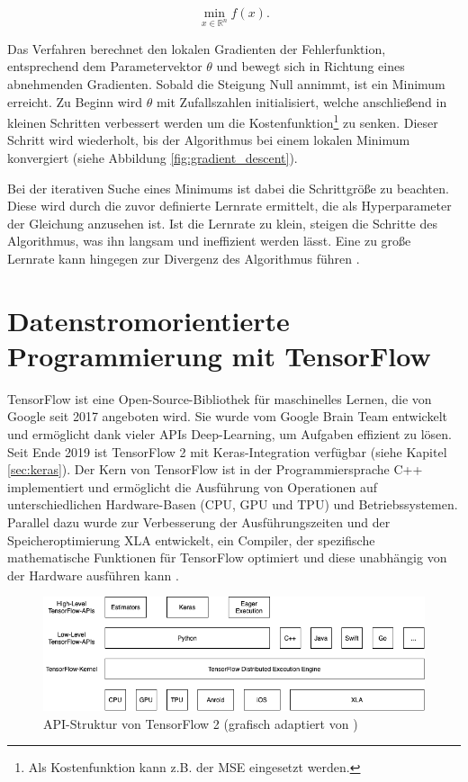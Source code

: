 \begin{equation}
	\min_{x\in\mathbb{R}^n} f(x).
\end{equation}

Das Verfahren berechnet den lokalen Gradienten der Fehlerfunktion, entsprechend dem Parametervektor $\theta$ und bewegt sich in Richtung eines abnehmenden Gradienten. Sobald die Steigung Null annimmt, ist ein Minimum erreicht. Zu Beginn wird $\theta$ mit Zufallszahlen initialisiert, welche anschließend in kleinen Schritten verbessert werden um die Kostenfunktion\footnote{Als Kostenfunktion kann z.B. der \ac{MSE} eingesetzt werden.} zu senken. Dieser Schritt wird wiederholt, bis der Algorithmus bei einem lokalen Minimum konvergiert \cite[112\psq]{Géron2017} (siehe Abbildung \ref{fig:gradient_descent}). 



Bei der iterativen Suche eines Minimums ist dabei die Schrittgröße zu beachten. Diese wird durch die zuvor definierte Lernrate ermittelt, die als \gls{Hyperparameter} der Gleichung anzusehen ist. Ist die Lernrate zu klein, steigen die Schritte des Algorithmus, was ihn langsam und ineffizient werden lässt. Eine zu große Lernrate kann hingegen zur Divergenz des Algorithmus führen \cite[114]{Géron2017}.


\section{Datenstromorientierte Programmierung mit TensorFlow}
TensorFlow ist eine Open-Source-Bibliothek für maschinelles Lernen, die von Google seit 2017 angeboten wird. Sie wurde vom Google Brain Team entwickelt und ermöglicht dank vieler \acp{API} Deep-Learning, um Aufgaben effizient zu lösen. Seit Ende 2019 ist TensorFlow 2 mit Keras-Integration verfügbar (siehe Kapitel \ref{sec:keras}). Der Kern von TensorFlow ist in der Programmiersprache C++ implementiert und ermöglicht die Ausführung von Operationen auf unterschiedlichen Hardware-Basen (\acs{CPU}, \ac{GPU} und \ac{TPU}) und Betriebssystemen.  Parallel dazu wurde zur Verbesserung der Ausführungszeiten und der Speicheroptimierung \ac{XLA} entwickelt, ein Compiler, der spezifische mathematische Funktionen für TensorFlow optimiert und diese unabhängig von der Hardware ausführen kann \cite[139\psq]{Deru2019}.

\begin{figure}[ht]
	\centering
	\includegraphics[width=\textwidth]{images/TF2-API-Struktur}
	\caption[TensorFlow API Struktur]{API-Struktur von TensorFlow 2 (grafisch adaptiert von \cite[140]{Deru2019}\cites{TfAPI})}
	\label{fig:tfstructure}
\end{figure}

